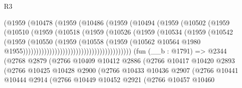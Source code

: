 \begin{lexlean}{R3}
\begin{coremodule}
                                      (@1959
                                        (@10478
                                          (@1959
                                            (@10486
                                              (@1959
                                                (@10494
                                                  (@1959
                                                    (@10502
                                                      (@1959
                                                        (@10510
                                                          (@1959
                                                            (@10518
                                                              (@1959
                                                                (@10526
                                                                  (@1959
                                                                    (@10534
                                                                      (@1959
                                                                        (@10542
                                                                          (@1959
                                                                            (@10550
                                                                              (@1959
                                                                                (@10558
                                                                                  (@1959
                                                                                    (@10562
                                                                                      @10564
                                                                                      @1980
                                                                                      @1955)))))))))))))))))))))))))))))))))))))))))
    (fun (__b : @1791) =>
    @2344
      (@2768
        @2879
        (@2766
          @10409
          @10412
          @2886
          (@2766
            @10417
            @10420
            @2893
            (@2766
              @10425
              @10428
              @2900
              (@2766
                @10433
                @10436
                @2907
                (@2766
                  @10441
                  @10444
                  @2914
                  (@2766
                    @10449
                    @10452
                    @2921
                    (@2766
                      @10457
                      @10460

\end{coremodule}
\end{lexlean}
